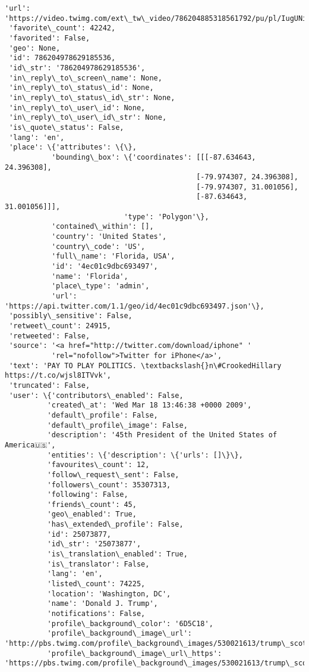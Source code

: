 \documentclass[11pt]{article}
\begin{document}
\begin{Verbatim}[commandchars=\\\{\}]
                                                               'url': 'https://video.twimg.com/ext\_tw\_video/786204885318561792/pu/pl/IugUNii3a7lmjApS.m3u8'\}]\}\}]\},
 'favorite\_count': 42242,
 'favorited': False,
 'geo': None,
 'id': 786204978629185536,
 'id\_str': '786204978629185536',
 'in\_reply\_to\_screen\_name': None,
 'in\_reply\_to\_status\_id': None,
 'in\_reply\_to\_status\_id\_str': None,
 'in\_reply\_to\_user\_id': None,
 'in\_reply\_to\_user\_id\_str': None,
 'is\_quote\_status': False,
 'lang': 'en',
 'place': \{'attributes': \{\},
           'bounding\_box': \{'coordinates': [[[-87.634643, 24.396308],
                                             [-79.974307, 24.396308],
                                             [-79.974307, 31.001056],
                                             [-87.634643, 31.001056]]],
                            'type': 'Polygon'\},
           'contained\_within': [],
           'country': 'United States',
           'country\_code': 'US',
           'full\_name': 'Florida, USA',
           'id': '4ec01c9dbc693497',
           'name': 'Florida',
           'place\_type': 'admin',
           'url': 'https://api.twitter.com/1.1/geo/id/4ec01c9dbc693497.json'\},
 'possibly\_sensitive': False,
 'retweet\_count': 24915,
 'retweeted': False,
 'source': '<a href="http://twitter.com/download/iphone" '
           'rel="nofollow">Twitter for iPhone</a>',
 'text': 'PAY TO PLAY POLITICS. \textbackslash{}n\#CrookedHillary https://t.co/wjsl8ITVvk',
 'truncated': False,
 'user': \{'contributors\_enabled': False,
          'created\_at': 'Wed Mar 18 13:46:38 +0000 2009',
          'default\_profile': False,
          'default\_profile\_image': False,
          'description': '45th President of the United States of America🇺🇸',
          'entities': \{'description': \{'urls': []\}\},
          'favourites\_count': 12,
          'follow\_request\_sent': False,
          'followers\_count': 35307313,
          'following': False,
          'friends\_count': 45,
          'geo\_enabled': True,
          'has\_extended\_profile': False,
          'id': 25073877,
          'id\_str': '25073877',
          'is\_translation\_enabled': True,
          'is\_translator': False,
          'lang': 'en',
          'listed\_count': 74225,
          'location': 'Washington, DC',
          'name': 'Donald J. Trump',
          'notifications': False,
          'profile\_background\_color': '6D5C18',
          'profile\_background\_image\_url': 'http://pbs.twimg.com/profile\_background\_images/530021613/trump\_scotland\_\_43\_of\_70\_cc.jpg',
          'profile\_background\_image\_url\_https': 'https://pbs.twimg.com/profile\_background\_images/530021613/trump\_scotland\_\_43\_of\_70\_cc.jpg',

\end{Verbatim}
\end{document}
